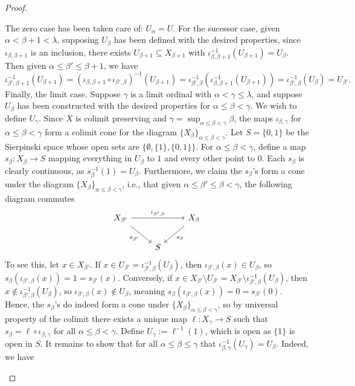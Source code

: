\documentclass{amsart}
\theoremstyle{plain}
\theoremstyle{definition}
\newcommand{\sseq}{\subseteq}
\newcommand{\0}{\mathbf{0}}
\renewcommand{\(}{\left(}
\renewcommand{\)}{\right)}
\begin{document}
\begin{proof}
\begin{enumerate}[label=(\roman*),listparindent=\parindent,parsep=0pt]
    The zero case has been taken care of: $U_\alpha=U$. For the sucessor case, given $\alpha<\beta+1<\lambda$, supposing $U_\beta$ has been defined with the desired properties, since $\iota_{\beta,\beta+1}$ is an inclusion, there exists $U_{\beta+1}\sseq X_{\beta+1}$ with $\iota_{\beta,\beta+1}^{-1}(U_{\beta+1})=U_\beta$. Then given $\alpha\leq\beta'\leq\beta+1$, we have
    \[\iota_{\beta',\beta+1}^{-1}(U_{\beta+1})=(\iota_{\beta,\beta+1}\circ\iota_{\beta',\beta})^{-1}(U_{\beta+1})=\iota_{\beta',\beta}^{-1}(\iota_{\beta,\beta+1}^{-1}(U_{\beta+1}))=\iota_{\beta',\beta}^{-1}(U_\beta)=U_{\beta'}.\]
    Finally, the limit case. Suppose $\gamma$ is a limit ordinal with $\alpha<\gamma\leq\lambda$, and suppose $U_\beta$ has been constructed with the desired properties for $\alpha\leq\beta<\gamma$. We wish to define $U_\gamma$. Since $X$ is colimit preserving and $\gamma=\sup_{\alpha\leq\beta<\gamma}\beta$, the maps $\iota_{\beta,\gamma}$ for $\alpha\leq\beta<\gamma$ form a colimit cone for the diagram $\{X_\beta\}_{\alpha\leq\beta<\gamma}$. Let $S=\{0,1\}$ be the Sierpinski space whose open sets are $\{\emptyset,\{1\},\{0,1\}\}$. For $\alpha\leq\beta<\gamma$, define a map $s_\beta:X_\beta\to S$ mapping everything in $U_\beta$ to $1$ and every other point to $0$. Each $s_\beta$ is clearly continuous, as $s_\beta^{-1}(1)=U_\beta$. Furthermore, we claim the $s_\beta$'s form a cone under the diagram $\{X_\beta\}_{\alpha\leq\beta<\gamma}$, i.e., that given $\alpha\leq\beta'\leq\beta<\gamma$, the following diagram commutes
    \[\begin{tikzcd}
      {X_{\beta'} } && {X_\beta} \\
      & S
      \arrow["{\iota_{\beta',\beta}}", from=1-1, to=1-3]
      \arrow["{s_\beta}", from=1-3, to=2-2]
      \arrow["{s_{\beta'}}"', from=1-1, to=2-2]
    \end{tikzcd}\]
    To see this, let $x\in X_{\beta'}$. If $x\in U_{\beta'}=\iota_{\beta',\beta}^{-1}(U_\beta)$, then $\iota_{\beta',\beta}(x)\in U_\beta$, so $s_\beta(\iota_{\beta',\beta}(x))=1=s_{\beta'}(x)$. Conversely, if $x\in X_{\beta'}\setminus U_{\beta'}=X_{\beta'}\setminus\iota^{-1}_{\beta',\beta}(U_\beta)$, then $x\notin \iota_{\beta',\beta}^{-1}(U_\beta)$, so $\iota_{\beta',\beta}(x)\notin U_{\beta}$, meaning $s_\beta(\iota_{\beta',\beta}(x))=0=s_{\beta'}(0)$. Hence, the $s_\beta$'s do indeed form a cone under $\{X_\beta\}_{\alpha\leq\beta<\gamma}$, so by universal property of the colimit there exists a unique map $\ell:X_\gamma\to S$ such that $s_\beta=\ell\circ\iota_{\beta,\gamma}$ for all $\alpha\leq\beta<\gamma$. Define $U_\gamma:=\ell^{-1}(1)$, which is open as $\{1\}$ is open in $S$. It remains to show that for all $\alpha\leq\beta\leq\gamma$ that $\iota_{\beta,\gamma}^{-1}(U_\gamma)=U_\beta$. Indeed, we have

\end{enumerate}
\end{proof}
\end{document}
